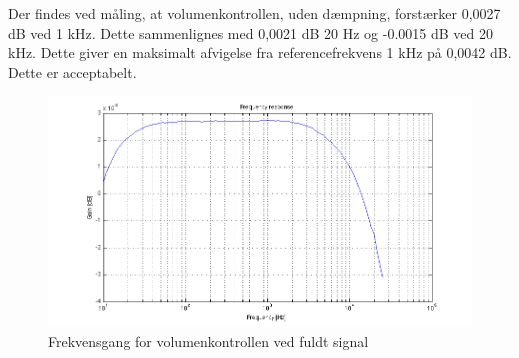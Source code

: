Der findes ved måling, at volumenkontrollen, uden dæmpning, forstærker 0,0027 dB ved 1 kHz. Dette sammenlignes med 0,0021 dB 20 Hz og -0.0015 dB ved 20 kHz. Dette giver en maksimalt afvigelse fra referencefrekvens 1 kHz på 0,0042 dB. Dette er acceptabelt.
\begin{figure}[h]
\centering
\includegraphics[width=\textwidth]{maalerapporter/volumenkontrol/2Vniveau0-frek.png}
\caption{Frekvensgang for volumenkontrollen ved fuldt signal}
\label{fig:accvold:frek0}
\end{figure}